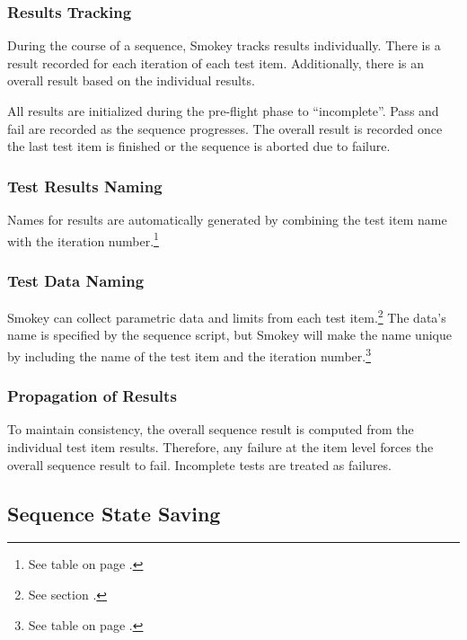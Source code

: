 \subsubsection{Results Tracking}

During the course of a sequence, Smokey tracks results individually.  There is
a result recorded for each iteration of each test item.  Additionally, there is
an overall result based on the individual results. 

All results are initialized during the pre-flight phase to ``incomplete''.
Pass and fail are recorded as the sequence progresses.  The overall result is
recorded once the last test item is finished or the sequence is aborted due to
failure.

\subsubsection{Test Results Naming}

Names for results are automatically generated by combining the test item name
with the iteration number.\footnote{See table
 on page
\pageref{tab:IndividualTestResults}.}

\subsubsection{Test Data Naming}

Smokey can collect parametric data and limits from each test item.\footnote{See
section .}  The data's name is specified by the
sequence script, but Smokey will make the name unique by including the name of
the test item and the iteration number.\footnote{See table
 on page \pageref{tab:TestData}.}

\subsubsection{Propagation of Results}

To maintain consistency, the overall sequence result is computed from the
individual test item results.  Therefore, any failure at the item level forces
the overall sequence result to fail.  Incomplete tests are treated as
failures.

\subsection{Sequence State Saving}
\label{sec:SeqStateSaving}

